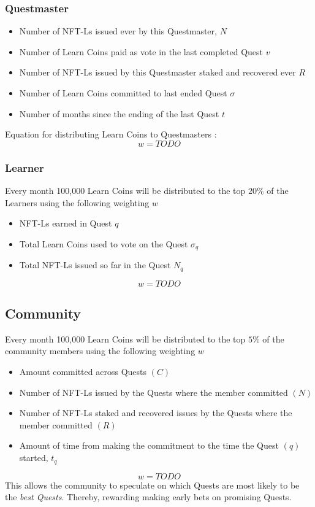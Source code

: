 \documentclass{article}
\begin{document}
      \subsubsection{Questmaster}
        \begin{itemize}
          \item Number of NFT-Ls issued ever by this Questmaster, \(N\)
          \item Number of Learn Coins paid as vote in the last completed Quest \(v\)
          \item Number of NFT-Ls issued by this Questmaster staked and recovered ever \(R\)
          \item Number of Learn Coins committed to last ended Quest \(\sigma\)
          \item Number of months since the ending of the last Quest \(t\)
        \end{itemize}
        Equation for distributing Learn Coins to Questmasters :
        \[
          w =  TODO
        \]

      \subsubsection{Learner }  
        Every month 100,000 Learn Coins will be distributed to the top \(20\%\) of the Learners using the following weighting \(w\) 
        \begin{itemize}
          \item NFT-Ls earned in Quest \(q\)
          \item Total Learn Coins used to vote on the Quest \(\sigma_q\)
          \item Total NFT-Ls issued so far in the Quest \(N_q\)
        \end{itemize}
        \[
          w = TODO
        \]
      \subsection{Community}
        Every month 100,000 Learn Coins will be distributed to the top \(5\%\) of the community members using the following weighting \(w\) 
        \begin{itemize}
          \item Amount committed across Quests \((C)\)
          \item Number of NFT-Ls issued by the Quests where the member committed \((N)\)
          \item Number of NFT-Ls staked and recovered issues by the Quests where the member committed \((R)\)
          \item Amount of time from making the commitment to the time the Quest \((q)\) started, \(t_q\)
        \end{itemize}
        \[
          w = TODO
        \]
        This allows the community to speculate on which Quests are most likely to be the \textit{best Quests}. Thereby, rewarding making early bets on promising Quests.
\end{document}
